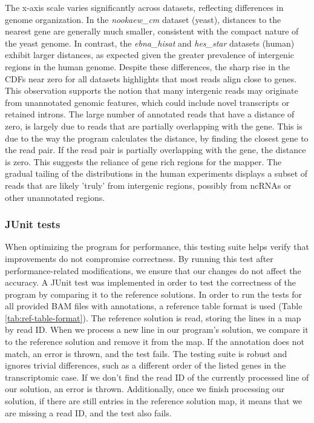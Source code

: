 \documentclass{article}
\begin{document}
    The x-axis scale varies significantly across datasets, reflecting differences in genome organization. In the \textit{nookaew\_cm} dataset (yeast), distances to the nearest gene are generally much smaller, consistent with the compact nature of the yeast genome. In contrast, the \textit{ebna\_hisat} and \textit{hes\_star} datasets (human) exhibit larger distances, as expected given the greater prevalence of intergenic regions in the human genome. Despite these differences, the sharp rise in the CDFs near zero for all datasets highlights that most reads align close to genes. This observation supports the notion that many intergenic reads may originate from unannotated genomic features, which could include novel transcripts or retained introns.
    The large number of annotated reads that have a distance of zero, is largely due to reads that are partially overlapping with the gene. This is due to the way the program calculates the distance, by finding the closest gene to the read pair. If the read pair is partially overlapping with the gene, the distance is zero. This suggests the reliance of gene rich regions for the mapper. The gradual tailing of the distributions in the human experiments displays a subset of reads that are likely 'truly' from intergenic regions, possibly from ncRNAs or other unannotated regions.

    \subsubsection{JUnit tests}
    When optimizing the program for performance, this testing suite helps verify that improvements do not compromise
    correctness. By running this test after performance-related modifications, we ensure that our changes do not affect
    the accuracy.
    A JUnit test was implemented in order to test the correctness of the program by comparing it to the reference
    solutions. In order to run the tests for all provided BAM files with annotations, a reference table format is used (Table \ref{tab:ref-table-format}). The reference solution is read, storing the lines in a map by read ID. When we process a new line in our program's solution, we compare it to the reference solution and remove it from the map. If the annotation does not match, an error is thrown, and the test fails. The testing suite is robust and ignores trivial differences, such as a different order of the listed genes in the transcriptomic case. If we don't find the read ID of the currently processed line of our solution, an error is thrown. Additionally, once we finish processing our solution, if there are still entries in the reference solution map, it means that we are missing a read ID, and the test also fails.
\end{document}
